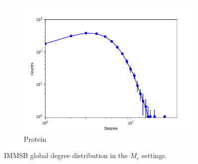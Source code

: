 \begin{figure}[h]
\begin{subfigure}[b]{0.300\textwidth}
            \includegraphics[width=\textwidth]{img/corpus/immsb_protein_0}
            \caption {{\small Protein}}    
            \label{fig:mean and std of net14}
        \end{subfigure}
        \caption{IMMSB global degree distribution in the $M_e$ settings. } 
        \label{fig:me_fit_gburst_mmsb}
\end{figure}
